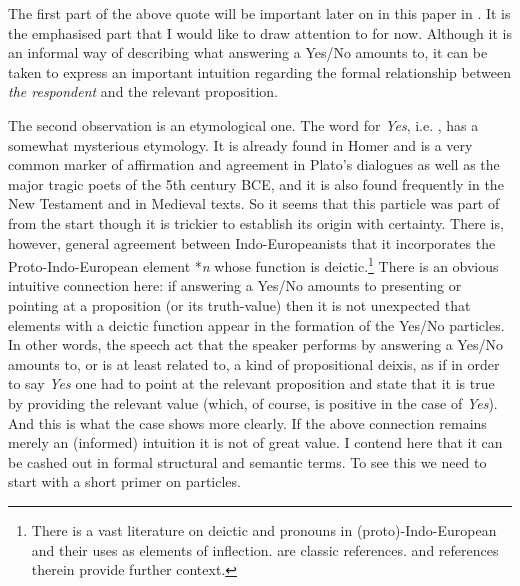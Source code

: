 \documentclass[output=paper]{LSP/langsci}
\begin{document}
The first part of the above quote will be important later on in this paper in .  It is the emphasised part that I would like to draw attention to for now.  Although it is an informal way of describing what answering a Yes/No  amounts to, it can be taken to express an important intuition regarding the formal relationship between \textit{the respondent} and the relevant proposition.

The second observation is an etymological one.  The  word for \textit{Yes}, i.e. \nai, has a somewhat mysterious etymology.  It is already found in Homer and is a very common marker of affirmation and agreement in Plato's dialogues as well as the major tragic poets of the 5th century BCE, and it is also found frequently in the New Testament and in Medieval texts.  So it seems that this particle was part of  from the start though it is trickier to establish its origin with certainty.  There is, however, general agreement between Indo-Europeanists that it incorporates the Proto-Indo-European element *\textit{n}  whose function is deictic.\footnote{There is a vast literature on deictic and  pronouns in (proto)-Indo-European and their uses as elements of inflection.  \citet{brugman:04,brugman:11} are classic references.  \citet{shields:92} and references therein provide further context.}  There is an obvious intuitive connection here: if answering a Yes/No  amounts to presenting or pointing at a proposition (or its truth-value) then it is not unexpected that elements with a deictic function appear in the formation of the Yes/No particles.
In other words, the speech act that the speaker performs by answering a Yes/No  amounts to, or is at least related to, a kind of propositional deixis, as if in order to say \textit{Yes} one had to point at the relevant proposition and state that it is true by providing the relevant  value (which, of course, is positive in the case of \textit{Yes}).  And this is what the  case shows more clearly.  If the above connection remains merely an (informed) intuition it is not of great value.   I contend here that it can be cashed out in formal structural and semantic terms.  To see this we need to start with a short primer on  particles.
\end{document}
